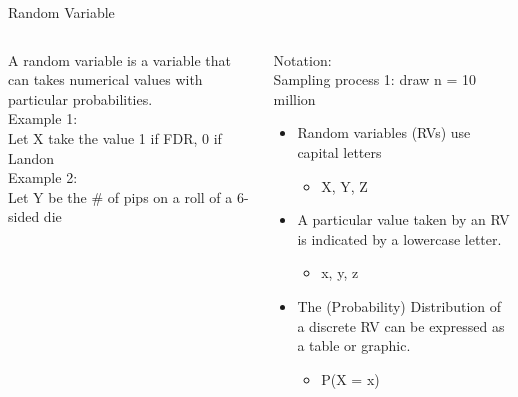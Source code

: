 \documentclass[aspectratio=169]{../latex_main/tntbeamer}  %
\begin{document}
	\begin{frame}{Random Variable}
	    \begin{columns}
	        \begin{column}{.4\textwidth}
	            A random variable is a variable that can takes numerical values with particular probabilities.\\
	            \bigskip
	            Example 1:\\
                Let X take the value 1 if FDR, 0 if Landon\\
                \bigskip
                Example 2:\\
                Let Y be the \# of pips on a roll of a 6-sided die
	        \end{column}
	        
	        \begin{column}{.4\textwidth}
	           Notation:\\
	           Sampling process 1: draw n = 10 million
                \begin{itemize}
                    \item Random variables (RVs) use capital letters
                    \begin{itemize}
                        \item X, Y, Z
                    \end{itemize}
                    \item A particular value taken by an RV is indicated by a lowercase letter.
                    \begin{itemize}
                        \item x, y, z
                    \end{itemize}
                    \item The (Probability) Distribution of a discrete RV can be expressed as a table or graphic.
                    \begin{itemize}
                        \item P(X = x)
                    \end{itemize}
                \end{itemize}
	        \end{column}
	    \end{columns}
	\end{frame}
	
	
	
\end{document}
